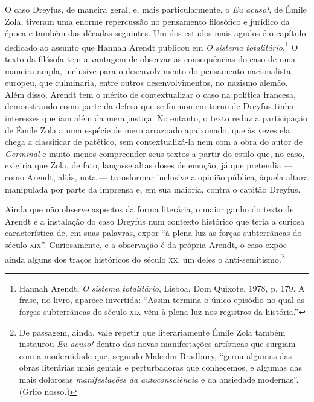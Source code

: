 O caso Dreyfus, de maneira geral, e, mais particularmente, o
\textit{Eu acuso!}, de Émile Zola, tiveram uma enorme repercussão no
pensamento filosófico e jurídico da época e também das décadas
seguintes. Um dos estudos mais agudos é o capítulo dedicado ao assunto
que Hannah Arendt publicou em \textit{O sistema totalitário}.\footnote{Hannah 
Arendt, \textit{O sistema totalitário}, Lisboa, Dom Quixote, 1978, p.
179. A frase, no livro, aparece invertida: “Assim termina o único
episódio no qual as forças subterrâneas do século \textsc{xix} vêm à plena luz
nos registros da história.”}  O texto da filósofa tem a vantagem de 
observar as consequências do caso de uma
maneira ampla, inclusive para o desenvolvimento do pensamento
nacionalista europeu, que culminaria, entre outros desenvolvimentos,
no nazismo alemão. Além disso, Arendt tem o mérito de contextualizar o
caso na política francesa, demonstrando como parte da defesa que se
formou em torno de Dreyfus tinha interesses que iam além da mera
justiça.  No entanto, o texto reduz a participação de Émile Zola a uma
espécie de mero arrazoado apaixonado, que às vezes ela chega a
classificar de patético, sem contextualizá-la nem com a obra do autor
de \textit{Germinal} e muito menos compreender seus textos a partir do
estilo que, no caso, exigiria que Zola, de fato, lançasse altas doses de
emoção, já que pretendia --- como Arendt, aliás, nota --- transformar
inclusive a opinião pública, àquela altura manipulada por parte da
imprensa e, em sua maioria, contra o capitão Dreyfus. 

Ainda que não observe aspectos da forma literária, o maior ganho do
texto de Arendt é a instalação do caso Dreyfus num contexto histórico
que teria a curiosa característica de, em suas palavras, expor “à plena
luz as forças subterrâneas do século \textsc{xix}”. Curiosamente, 
e a observação é da própria Arendt, o caso expõe ainda alguns dos traços 
históricos do século \textsc{xx}, um deles o anti-semitismo.\footnote{ De passagem, ainda, vale repetir
que literariamente Émile Zola também instaurou \textit{Eu acuso!} dentro
das novas manifestações artísticas que surgiam com a modernidade que,
segundo Malcolm Bradbury, “gerou algumas das obras literárias mais
geniais e perturbadoras que conhecemos, e algumas das mais dolorosas
\textit{manifestações da autoconsciência} e da ansiedade modernas”. (Grifo nosso.)  }

